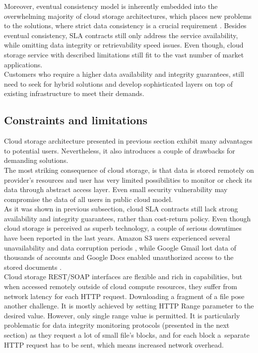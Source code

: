 Moreover, eventual consistency model is inherently embedded into the
overwhelming majority of cloud storage architectures, which places new problems
to the solutions, where strict data consistency is a crucial requirement
\cite{metastorage, cloud-federation}. Besides eventual consistency, SLA
contracts still only address the service availability, while omitting data
integrity or retrievability speed issues. Even though, cloud storage service
with described limitations still fit to the vast number of market 
applications.\\

Customers who require a higher data availability and integrity guarantees,
still need to seek for hybrid solutions and develop sophisticated layers on
top of existing infrastructure to meet their demands.

		\subsection{Constraints and limitations}
Cloud storage architecture presented in previous section exhibit many
advantages to potential users. Nevertheless, it also introduces a couple of
drawbacks for demanding solutions.\\

The most striking consequence of cloud storage, is that data is stored remotely
on provider's resources and user has very limited possibilities to monitor or
check its data through abstract access layer. Even small security vulnerability
may compromise the data of all users in public cloud model.\\

As it was shown in previous subsection, cloud SLA contracts still lack strong
availability and integrity guarantees, rather than cost-return policy. Even
though cloud storage is perceived as superb technology, a couple of serious
downtimes have been reported in the last years. Amazon S3 users experienced
several unavailability and data corruption periods
\cite{amazon-downtime1,amazon-downtime2},
while Google Gmail lost data of thousands of accounts 
\cite{gmail-downtime} and
Google Docs enabled unauthorized access to the stored documents 
\cite{docs-downtime}.\\

Cloud storage REST/SOAP interfaces are flexible and rich in capabilities, but
when accessed remotely outside of cloud compute resources, they suffer from
network latency for each HTTP request. Downloading a fragment of a file pose
another challenge. It is mostly achieved by setting HTTP Range parameter to the
desired value. However, only single range value is permitted. It is particularly
problematic for data integrity monitoring protocols (presented in the next
section) as they request a lot of small file's blocks, and for each block 
a~separate HTTP request has to be sent, which means increased network
overhead.\\

